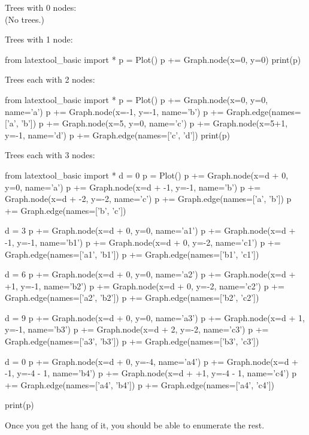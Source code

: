 
Trees with 0 nodes:
\[
\]
(No trees.)

Trees with 1 node:
\begin{python}
from latextool_basic import *
p = Plot()
p += Graph.node(x=0, y=0)
print(p)
\end{python}

Trees each with 2 nodes:
\begin{python}
from latextool_basic import *
p = Plot()
p += Graph.node(x=0, y=0, name='a')
p += Graph.node(x=-1, y=-1, name='b')
p += Graph.edge(names=['a', 'b'])
p += Graph.node(x=5, y=0, name='c')
p += Graph.node(x=5+1, y=-1, name='d')
p += Graph.edge(names=['c', 'd'])
print(p)
\end{python}


Trees each with 3 nodes:
\begin{python}
from latextool_basic import *
d = 0
p = Plot()
p += Graph.node(x=d + 0, y=0, name='a')
p += Graph.node(x=d + -1, y=-1, name='b')
p += Graph.node(x=d + -2, y=-2, name='c')
p += Graph.edge(names=['a', 'b'])
p += Graph.edge(names=['b', 'c'])

d = 3
p += Graph.node(x=d + 0, y=0, name='a1')
p += Graph.node(x=d + -1, y=-1, name='b1')
p += Graph.node(x=d + 0, y=-2, name='c1')
p += Graph.edge(names=['a1', 'b1'])
p += Graph.edge(names=['b1', 'c1'])

d = 6
p += Graph.node(x=d + 0, y=0, name='a2')
p += Graph.node(x=d + +1, y=-1, name='b2')
p += Graph.node(x=d + 0, y=-2, name='c2')
p += Graph.edge(names=['a2', 'b2'])
p += Graph.edge(names=['b2', 'c2'])

d = 9
p += Graph.node(x=d + 0, y=0, name='a3')
p += Graph.node(x=d + 1, y=-1, name='b3')
p += Graph.node(x=d + 2, y=-2, name='c3')
p += Graph.edge(names=['a3', 'b3'])
p += Graph.edge(names=['b3', 'c3'])

d = 0
p += Graph.node(x=d + 0, y=-4, name='a4')
p += Graph.node(x=d + -1, y=-4 - 1, name='b4')
p += Graph.node(x=d + +1, y=-4 - 1, name='c4')
p += Graph.edge(names=['a4', 'b4'])
p += Graph.edge(names=['a4', 'c4'])

print(p)
\end{python}

Once you get the hang of it, you should be able to enumerate the rest.


    

